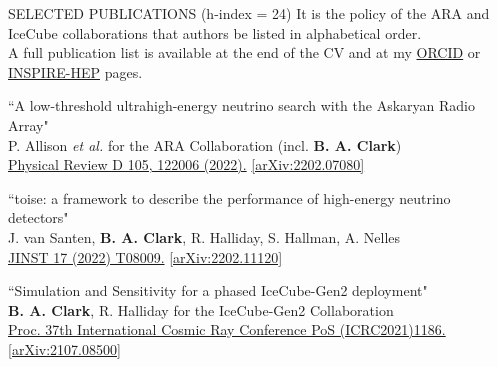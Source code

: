 \documentclass{resume} %
\begin{document}
\newpage
\begin{rSection}{SELECTED PUBLICATIONS (h-index = 24)}
It is the policy of the ARA and IceCube collaborations that authors be listed in alphabetical order. \\  A full publication list is available at the end of the CV and at my \href{https://orcid.org/0000-0003-4089-2245}{ORCID}  or  \href{https://inspirehep.net/author/profile/Brian.A.Clark.1}{INSPIRE-HEP} pages.

\begin{etaremune}%

  \item ``A low-threshold ultrahigh-energy neutrino search with the Askaryan Radio Array" \\
 P. Allison {\it et al.} for the ARA Collaboration (incl. \textbf{B. A. Clark})\\ \href{https://doi.org/10.1103/PhysRevD.105.122006}{Physical Review D 105, 122006 (2022).}  \href{https://arxiv.org/abs/2202.07080}{[arXiv:2202.07080]}


  \item ``toise: a framework to describe the performance of high-energy neutrino detectors" \\
 J. van Santen, \textbf{B. A. Clark}, R. Halliday, S. Hallman, A. Nelles \\  \href{https://doi.org/10.1088/1748-0221/17/08/T08009}{JINST 17 (2022) T08009.}  \href{https://arxiv.org/abs/2202.11120}{[arXiv:2202.11120]}


  \item ``Simulation and Sensitivity for a phased IceCube-Gen2 deployment" \\
 \textbf{B. A. Clark}, R. Halliday for the IceCube-Gen2 Collaboration \\ \href{https://doi.org/10.22323/1.395.1186}{Proc. 37th International Cosmic Ray Conference PoS (ICRC2021)1186.}  \href{https://arxiv.org/abs/2107.08500}{[arXiv:2107.08500]}
 


\end{etaremune}
\end{rSection}
\end{document}
